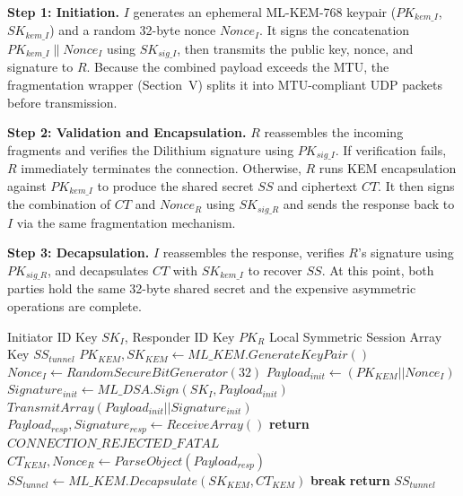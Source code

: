 \documentclass[10pt, conference, letterpaper]{IEEEtran}
\begin{document}
\textbf{Step 1: Initiation.} $I$ generates an ephemeral ML-KEM-768 keypair ($PK_{kem\_I}$, $SK_{kem\_I}$) and a random 32-byte nonce $Nonce_{I}$. It signs the concatenation $PK_{kem\_I} \| Nonce_{I}$ using $SK_{sig\_I}$, then transmits the public key, nonce, and signature to $R$. Because the combined payload exceeds the MTU, the fragmentation wrapper (Section~V) splits it into MTU-compliant UDP packets before transmission.

\textbf{Step 2: Validation and Encapsulation.} $R$ reassembles the incoming fragments and verifies the Dilithium signature using $PK_{sig\_I}$. If verification fails, $R$ immediately terminates the connection. Otherwise, $R$ runs KEM encapsulation against $PK_{kem\_I}$ to produce the shared secret $SS$ and ciphertext $CT$. It then signs the combination of $CT$ and $Nonce_{R}$ using $SK_{sig\_R}$ and sends the response back to $I$ via the same fragmentation mechanism.

\textbf{Step 3: Decapsulation.} $I$ reassembles the response, verifies $R$'s signature using $PK_{sig\_R}$, and decapsulates $CT$ with $SK_{kem\_I}$ to recover $SS$. At this point, both parties hold the same 32-byte shared secret and the expensive asymmetric operations are complete.

\begin{algorithm}[H]
\caption{Double-Blind Handshake \& Encapsulation}\label{alg:handshake}
\begin{algorithmic}[1]
\renewcommand{\algorithmicrequire}{\textbf{Input:}}
\renewcommand{\algorithmicensure}{\textbf{Output:}}
\REQUIRE Initiator ID Key $SK_{I}$, Responder ID Key $PK_{R}$
\ENSURE Local Symmetric Session Array Key $SS_{tunnel}$
\STATE {}
\STATE $PK_{KEM}, SK_{KEM} \leftarrow ML\_KEM.GenerateKeyPair()$
\STATE $Nonce_I \leftarrow RandomSecureBitGenerator(32)$
\STATE $Payload_{init} \leftarrow (PK_{KEM} || Nonce_I)$
\STATE $Signature_{init} \leftarrow ML\_DSA.Sign(SK_{I}, Payload_{init})$
\STATE $TransmitArray(Payload_{init} || Signature_{init})$
    \STATE $Payload_{resp}, Signature_{resp} \leftarrow ReceiveArray()$
        \STATE \textbf{return} $CONNECTION\_REJECTED\_FATAL$
    \ENDIF
    \STATE $CT_{KEM}, Nonce_R \leftarrow ParseObject(Payload_{resp})$
    \STATE $SS_{tunnel} \leftarrow ML\_KEM.Decapsulate(SK_{KEM}, CT_{KEM})$
    \STATE \textbf{break}
\ENDWHILE
\STATE \textbf{return} $SS_{tunnel}$
\end{algorithmic}
\end{algorithm}
\end{document}

